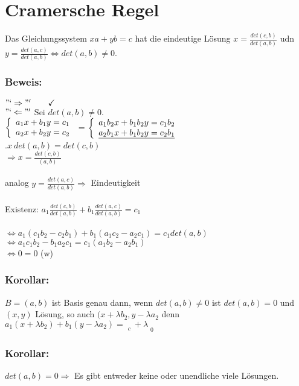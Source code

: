 \section{Cramersche Regel}
Das Gleichungssystem $xa+yb=c$ hat die eindeutige Lösung $x = \frac{det(c,b)}{det(a,b)}$ udn $y = \frac{det(a,c)}{det(a,b)} \Leftrightarrow det(a,b) \neq 0$.
%
%
%
\subsubsection{Beweis: }
$"`\Rightarrow "' \qquad \checkmark$\\
$"`\Leftarrow "'$ Sei $det(a,b) \neq 0$.\\
$ \left\{
  \begin{array}{l l}
    a_{1}x + b_{1}y = c_{1} \\
    a_{2}x + b_{2}y = c_{2}
  \end{array} \right.$
=
$\left\{
\begin{array}{l l}
a_{1}b_{2}x+b_{1}b_{2}y=c_{1}b_{2} \\
\underline{ a_{2}b_{1}x+b_{1}b_{2}y=c_{2}b_{1} }
\end{array} \right.$\\
.\qquad\qquad\qquad\qquad\qquad $x ~ det(a,b)  = det(c,b)$\\
$\Rightarrow x = \frac{det(c,b)}{(a,b)}$\\
\quad\\
analog $y=\frac{det(a,c)}{det(a,b)} \Rightarrow$ Eindeutigkeit\\
\quad\\
Existenz: $a_{1} \frac{det(c,b)}{det(a,b)} + b_{1} \frac{det(a,c)}{det(a,b)} = c_{1}$\\
\quad\\
$\Leftrightarrow a_{1}(c_{1}b_{2}-c_{2}b_{1})+b_{1}(a_{1}c_{2}-a_{2}c_{1})=c_{1} det(a,b)$\\
$\Leftrightarrow a_{1}c_{1}b_{2} - b_{1}a_{2}c_{1} = c_{1}(a_{1}b_{2}-a_{2}b_{1})$\\
$\Leftrightarrow 0 = 0$ (w)
%
%
%
\subsubsection{Korollar:}
$B=(a,b)$ ist Basis genau dann, wenn $det(a,b) \neq 0$ ist $det(a,b)=0$ und $(x,y)$ Lösung, so auch $(x+\lambda b_{2}, y-\lambda a_{2}$ denn $a_{1}(x+\lambda b_{2})+b_{1}(y-\lambda a_{2})=\mathop{\underbrace{a_{1}x+b_{1}y}}\limits_{c}+\lambda\mathop{\underbrace{(a_{1} b_{2}-b_{1}a_{2})}}\limits_{0}$
%
%
%
\subsubsection{Korollar:}
$det(a,b)=0 \Rightarrow$ Es gibt entweder keine oder unendliche viele Lösungen.